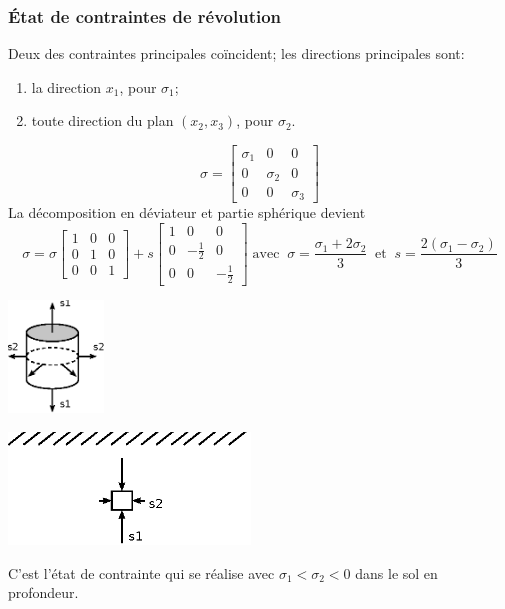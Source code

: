 \subsubsection{État  de  contraintes  de  révolution}
Deux des contraintes principales coïncident; les directions principales sont:
\begin{enumerate}
    \item la direction $x_1$, pour $\sigma_1$;
    \item toute direction du plan $\left( x_2, x_3 \right)$, pour $\sigma_2$.
\end{enumerate}
\begin{equation}
    \mathbb{\sigma} = 
    \begin{bmatrix}
        \sigma_1 & 0 & 0 \\
        0 & \sigma_2 & 0 \\
        0 & 0 & \sigma_3
    \end{bmatrix}
    \label{eq:Ch02-018}
\end{equation}
La décomposition en déviateur et partie sphérique devient 
\begin{equation}
    \mathbb{\sigma} = \sigma 
    \begin{bmatrix}
        1 & 0 & 0\\
        0 & 1 & 0\\
        0 & 0 & 1
    \end{bmatrix}
    +
    s
    \begin{bmatrix}
        1 & 0 & 0\\
        0 & -\frac{1}{2} & 0\\
        0 & 0 & -\frac{1}{2}
    \end{bmatrix}\;\text{avec} \;\;
    \sigma = \frac{\sigma_1 + 2\sigma_2}{3} \;\;\text{et}\;\; s = \frac{2\left( \sigma_1 - \sigma_2 \right)}{3}
    \label{eq:Ch02-019}
\end{equation}
\begin{multicols}{2}
    \begin{center}
        \includegraphics[height=3cm]{../images/T1_Ch02-0007a}
    \end{center}
    \columnbreak
    \begin{center}
        \includegraphics[height=3cm]{../images/T1_Ch02-0007b}
    \end{center}
\end{multicols}
C'est l'état de contrainte qui se réalise avec $\sigma_1 <\sigma_2 < 0$ dans le sol en profondeur. 
